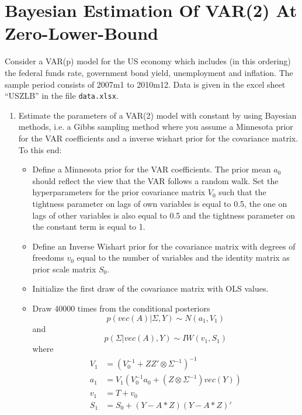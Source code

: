 \documentclass[a4paper]{scrartcl}
\begin{document}
    \section{Bayesian Estimation Of VAR(2) At Zero-Lower-Bound}
    Consider a VAR(p) model for the US economy which includes (in this ordering) the federal funds rate, government bond yield, unemployment and inflation. The sample period consists of 2007m1 to 2010m12. Data is given in the excel sheet \enquote{USZLB} in the file \texttt{data.xlsx}.\\
    \begin{enumerate}
        \item Estimate the parameters of a VAR(2) model with constant by using Bayesian methods, i.e. a Gibbs sampling method where you assume a Minnesota prior for the VAR coefficients and a inverse wishart prior for the covariance matrix.\\To this end:
              \begin{itemize}
                  \item Define a Minnesota prior for the VAR coefficients. The prior mean $a_0$ should reflect the view that the VAR follows a random walk. Set the hyperparameters for the prior covariance matrix $V_0$ such that the tightness parameter on lags of own variables is equal to 0.5, the one on lags of other variables is also equal to 0.5 and the tightness parameter on the constant term is equal to 1.
                  \item Define an Inverse Wishart prior for the covariance matrix with degrees of freedoms $v_0$ equal to the number of variables and the identity matrix as prior scale matrix $S_0$.
                  \item Initialize the first draw of the covariance matrix with OLS values.
                  \item Draw 40000 times from the conditional posteriors $$p(vec(A)|\Sigma,Y) \sim N(a_1,V_1)$$ and $$p(\Sigma|vec(A),Y) \sim IW(v_1, S_1)$$ where
                        \begin{align*}
                            V_1 & = (V_0^{-1}+ZZ' \otimes \Sigma^{-1})^{-1}           \\
                            a_1 & = V_1 (V_0^{-1}a_0 + (Z \otimes \Sigma^{-1})vec(Y)) \\
                            v_1 & = T + v_0                                           \\
                            S_1 & = S_0 + (Y - A*Z)(Y - A*Z)'
                        \end{align*}

\end{itemize}
\end{enumerate}
\end{document}
